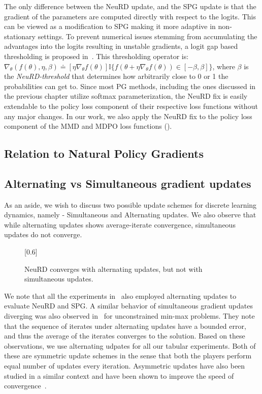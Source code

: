 The only difference between the NeuRD update, and the SPG update is that the gradient of the
parameters are computed directly with respect to the logits.
This can be viewed as a modification to SPG making it more adaptive in non-stationary settings.
To prevent numerical issues stemming from accumulating the advantages into the logits resulting in
unstable gradients, a logit gap based thresholding is proposed in~\cite{hennesNeural2020}.
This thresholding operator is: $\nabla_{\theta}(f(\theta), \eta, \beta) \doteq [\eta\nabla_\theta
		f(\theta)] \mathds{I}\{f(\theta + \eta\nabla_{\theta}f(\theta)) \in [-\beta, \beta]\}$, where
$\beta$ is the \textit{NeuRD-threshold} that determines how arbitrarily close to 0 or 1 the
probabilities can get to.
Since most PG methods, including the ones discussed in the previous chapter utilize softmax
parameterization, the NeuRD fix is easily extendable to the policy loss component of their
respective loss functions without any major changes.
In our work, we also apply the NeuRD fix to the policy loss component of the MMD and MDPO loss
functions ().

\subsection{Relation to Natural Policy Gradients}

\subsection{Alternating vs Simultaneous gradient updates}
As an aside, we wish to discuss two possible update schemes for discrete learning dynamics, namely
- Simultaneous and Alternating updates.
We also observe that while alternating updates shows average-iterate convergence, simultaneous
updates do not converge.
\begin{figure}[H]
	\centering
	\scalebox{0.6}[0.6]{}
	\caption[Simultaneous gradient updates vs Alternate gradient updates updates]{NeuRD converges with alternating updates, but not with simultaneous updates.}
\end{figure}
We note that all the experiments in~\cite{hennesNeural2020} also employed alternating updates to
evaluate NeuRD and SPG.
A similar behavior of simultaneous gradient updates diverging was also observed
in~\cite{gidelVariational2020} for unconstrained min-max problems.
They note that the sequence of iterates under alternating updates have a bounded error, and thus
the average of the iterates converges to the solution.
Based on these observations, we use alternating udpates for all our tabular experiments.
Both of these are symmetric update schemes in the sense that both the players perform equal number
of updates every iteration.
Asymmetric updates have also been studied in a similar context and have been shown to improve the
speed of convergence~\cite{daskalakisTraining2018}.

